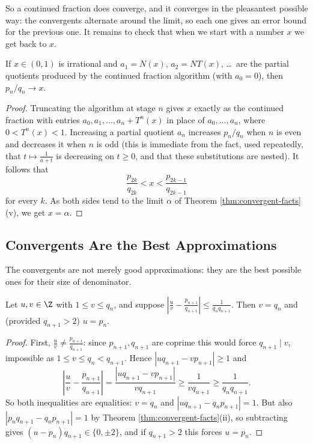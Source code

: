 So a continued fraction does converge, and it converges in the pleasantest possible way: the convergents alternate around the limit, so each one gives an error bound for the previous one. It remains to check that when we start with a number $x$ we get back to $x$.

\begin{lemma}\label{lem:cf-value}
	If $x\in(0,1)$ is irrational and $a_1 = N(x)$, $a_2 = NT(x)$, \ldots\ are the partial quotients produced by the continued fraction algorithm (with $a_0 = 0$), then $p_n/q_n\to x$.
\end{lemma}

\begin{proof}
	Truncating the algorithm at stage $n$ gives $x$ exactly as the continued fraction with entries $a_0,a_1,\ldots,a_n+T^{n}(x)$ in place of $a_0,\ldots,a_n$, where $0<T^n(x)<1$. Increasing a partial quotient $a_n$ increases $p_n/q_n$ when $n$ is even and decreases it when $n$ is odd (this is immediate from the fact, used repeatedly, that $t\mapsto\frac{1}{a+t}$ is decreasing on $t\geq0$, and that these substitutions are nested). It follows that
	$$\frac{p_{2k}}{q_{2k}} < x < \frac{p_{2k-1}}{q_{2k-1}}$$
	for every $k$. As both sides tend to the limit $\alpha$ of Theorem \ref{thm:convergent-facts}(v), we get $x=\alpha$.
\end{proof}

\subsection{Convergents Are the Best Approximations}

The convergents are not merely good approximations: they are the best possible ones for their size of denominator.

\begin{lemma}\label{lem:cf-best-lemma}
	Let $u,v\in\Z$ with $1\leq v\leq q_n$, and suppose $\left|\frac uv - \frac{p_{n+1}}{q_{n+1}}\right|\leq\frac{1}{q_nq_{n+1}}$. Then $v=q_n$ and (provided $q_{n+1}>2$) $u = p_n$.
\end{lemma}

\begin{proof}
	First, $\frac uv \neq \frac{p_{n+1}}{q_{n+1}}$: since $p_{n+1},q_{n+1}$ are coprime this would force $q_{n+1}\mid v$, impossible as $1\leq v\leq q_n<q_{n+1}$. Hence $|uq_{n+1}-vp_{n+1}|\geq1$ and
	$$\left|\frac uv-\frac{p_{n+1}}{q_{n+1}}\right| = \frac{|uq_{n+1}-vp_{n+1}|}{vq_{n+1}} \geq \frac{1}{vq_{n+1}}\geq\frac{1}{q_nq_{n+1}}.$$
	So both inequalities are equalities: $v = q_n$ and $|uq_{n+1}-q_np_{n+1}|=1$. But also $|p_nq_{n+1}-q_np_{n+1}|=1$ by Theorem \ref{thm:convergent-facts}(ii), so subtracting gives $(u-p_n)q_{n+1}\in\{0,\pm2\}$, and if $q_{n+1}>2$ this forces $u = p_n$.
\end{proof}

